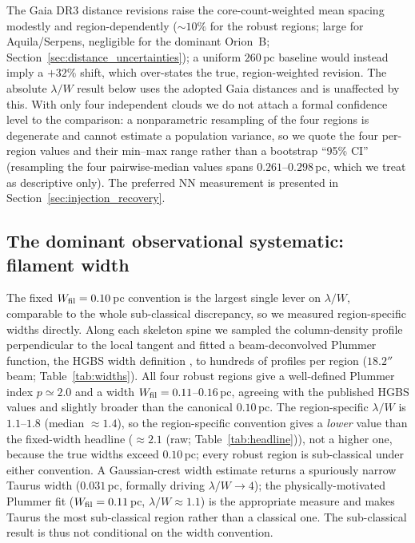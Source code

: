 \documentclass[usenatbib,twoside,twocolumn]{mnras}
\begin{document}
The Gaia DR3 distance revisions raise the core-count-weighted mean spacing modestly and region-dependently ($\sim10\%$ for the robust regions; large for Aquila/Serpens, negligible for the dominant Orion~B; Section~\ref{sec:distance_uncertainties}); a uniform $260$\,pc baseline would instead imply a $+32\%$ shift, which over-states the true, region-weighted revision. The absolute $\lambda/W$ result below uses the adopted Gaia distances and is unaffected by this. With only four independent clouds we do not attach a formal confidence level to the comparison: a nonparametric resampling of the four regions is degenerate and cannot estimate a population variance, so we quote the four per-region values and their min--max range rather than a bootstrap ``95\% CI'' (resampling the four pairwise-median values spans $0.261$--$0.298$\,pc, which we treat as descriptive only). The preferred NN measurement is presented in Section~\ref{sec:injection_recovery}.

\subsection{The dominant observational systematic: filament width}
\label{sec:widths}

The fixed $W_{\rm fil}=0.10$\,pc convention is the largest single lever on $\lambda/W$, comparable to the whole sub-classical discrepancy, so we measured region-specific widths directly. Along each skeleton spine we sampled the column-density profile perpendicular to the local tangent and fitted a beam-deconvolved Plummer function, the HGBS width definition \citep{Arzoumanian2019}, to hundreds of profiles per region ($18.2''$ beam; Table~\ref{tab:widths}). All four robust regions give a well-defined Plummer index $p\simeq2.0$ and a width $W_{\rm fil}=0.11$--$0.16$\,pc, agreeing with the published HGBS values \citep{Arzoumanian2019} and slightly broader than the canonical $0.10$\,pc. The region-specific $\lambda/W$ is $1.1$--$1.8$ (median $\approx1.4$), so the region-specific convention gives a \emph{lower} value than the fixed-width headline ($\approx2.1$ (raw; Table~\ref{tab:headline})), not a higher one, because the true widths exceed $0.10$\,pc; every robust region is sub-classical under either convention. A Gaussian-crest width estimate returns a spuriously narrow Taurus width ($0.031$\,pc, formally driving $\lambda/W\to4$); the physically-motivated Plummer fit ($W_{\rm fil}=0.11$\,pc, $\lambda/W\approx1.1$) is the appropriate measure and makes Taurus the most sub-classical region rather than a classical one. The sub-classical result is thus not conditional on the width convention.
\end{document}
